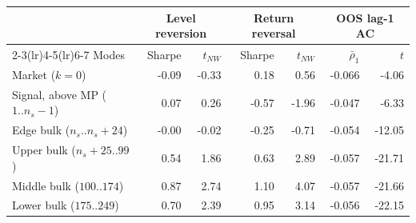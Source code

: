 \begin{tabular}{lrrrrrr}
\toprule
 & \multicolumn{2}{c}{Level reversion} & \multicolumn{2}{c}{Return reversal} & \multicolumn{2}{c}{OOS lag-1 AC} \\
\cmidrule(lr){2-3}\cmidrule(lr){4-5}\cmidrule(lr){6-7}
Modes & Sharpe & $t_{NW}$ & Sharpe & $t_{NW}$ & $\bar\rho_1$ & $t$ \\
\midrule
Market ($k=0$) & -0.09 & -0.33 & 0.18 & 0.56 & -0.066 & -4.06 \\
Signal, above MP ($1..n_s-1$) & 0.07 & 0.26 & -0.57 & -1.96 & -0.047 & -6.33 \\
Edge bulk ($n_s..n_s+24$) & -0.00 & -0.02 & -0.25 & -0.71 & -0.054 & -12.05 \\
Upper bulk ($n_s+25..99$) & 0.54 & 1.86 & 0.63 & 2.89 & -0.057 & -21.71 \\
Middle bulk ($100..174$) & 0.87 & 2.74 & 1.10 & 4.07 & -0.057 & -21.66 \\
Lower bulk ($175..249$) & 0.70 & 2.39 & 0.95 & 3.14 & -0.056 & -22.15 \\
\bottomrule
\end{tabular}